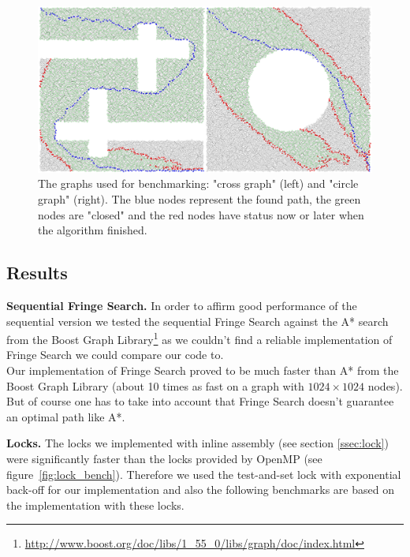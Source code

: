 \documentclass[letterpaper]{article}
\newcommand{\mypar}[1]{{\bf #1.}}
\begin{document}
\begin{figure}[h]\centering
  \includegraphics[scale=0.3]{benchmark_graphs.eps}
  \caption{The graphs used for benchmarking: "cross graph" (left) and "circle graph" (right). The blue nodes represent the found path, the green nodes are "closed" and the red nodes have status now or later when the algorithm finished. \label{fig:graphs}}
\end{figure}

\subsection{Results}\label{ssec:results}

\mypar{Sequential Fringe Search}
In order to affirm good performance of the sequential version we tested the sequential Fringe Search against the A* search from the Boost Graph Library\footnote{\url{http://www.boost.org/doc/libs/1_55_0/libs/graph/doc/index.html}} as we couldn't find a reliable implementation of Fringe Search we could compare our code to.\\
Our implementation of Fringe Search proved to be much faster than A* from the Boost Graph Library (about 10 times as fast on a graph with $1024 \times 1024$ nodes). But of course one has to take into account that Fringe Search doesn't guarantee an optimal path like A*.

\mypar{Locks}
The locks we implemented with inline assembly (see section \ref{ssec:lock}) were significantly faster than the locks provided by OpenMP (see figure~\ref{fig:lock_bench}). Therefore we used the test-and-set lock with exponential back-off for our implementation and also the following benchmarks are based on the implementation with these locks.
\end{document}
